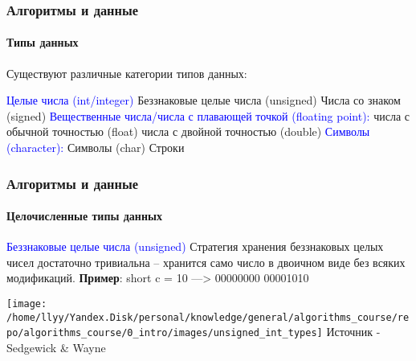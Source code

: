 \documentclass[aspectratio=169]{beamer}
\begin{document}
\begin{frame}
\frametitle{Алгоритмы и данные}
\framesubtitle{Типы данных}
\justifying
\small

Существуют различные категории типов данных:\newline\newline

\textcolor{blue}{Целые числа (int/integer)}\newline
Беззнаковые целые числа (unsigned)\newline
Числа со знаком (signed)\newline\newline
\textcolor{blue}{Вещественные числа/числа с плавающей точкой (floating point):}\newline
числа с обычной точностью (float)\newline
числа с двойной точностью (double)\newline\newline
\textcolor{blue}{Символы (character):}\newline
Символы (char)\newline
Строки
\end{frame}

\begin{frame}
\frametitle{Алгоритмы и данные}
\framesubtitle{Целочисленные типы данных}
\justifying
\small

\textcolor{blue}{Беззнаковые целые числа (unsigned)}\newline\newline
Стратегия хранения беззнаковых целых чисел достаточно тривиальна – хранится само число в двоичном виде без всяких модификаций.\newline\newline
\textbf{Пример}: short c = 10 ---> 00000000 00001010\newline

\centering
\texttt{[image: /home/llyy/Yandex.Disk/personal/knowledge/general/algorithms\_course/repo/algorithms\_course/0\_intro/images/unsigned\_int\_types]}\newline
\centering
\tiny Источник - Sedgewick \& Wayne
\end{frame}
\end{document}
